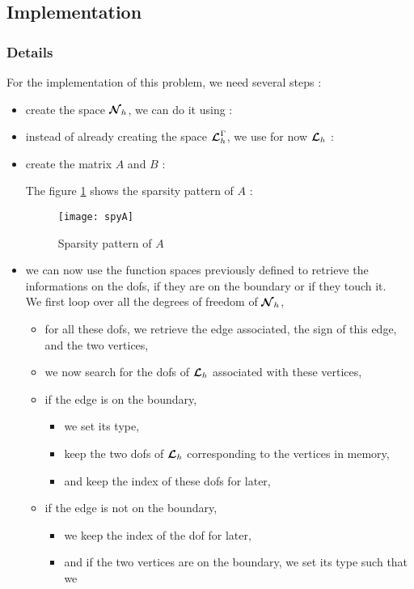 \subsection{Implementation}
\subsubsection{Details}

For the implementation of this problem, we need several steps :
\begin{itemize}
\item create the space ${\bm{\mathcal{N}}}_h$, we can do it using :

\item instead of already creating the space ${\bm{\mathcal{L}}}_h^\Gamma$, we use for now ${\bm{\mathcal{L}}}_h$ :

\item create the matrix $A$ and $B$ :

The figure \ref{spyA} shows the sparsity pattern of $A$ : 
\begin{figure}[H]
\centering
\texttt{[image: spyA]}
\caption{Sparsity pattern of $A$}
\label{spyA}
\end{figure}
\item we can now use the function spaces previously defined to retrieve the
  informations on the dofs, if they are on the boundary or if they touch it.\\
We first loop over all the degrees of freedom of ${\bm{\mathcal{N}}}_h$,
\begin{itemize}
\item for all these dofs, we retrieve the edge associated, the sign of this
  edge, and the two vertices,
\item we now search for the dofs of ${\bm{\mathcal{L}}}_h$ associated with these vertices,
\item if the edge is on the boundary,
\begin{itemize}
\item we set its type,
\item keep the two dofs of ${\bm{\mathcal{L}}}_h$ corresponding to the vertices in memory,
\item  and keep the index of these dofs for later,
\end{itemize}
\item if the edge is not on the boundary,
\begin{itemize}
\item we keep the index of the dof for later,
\item and if the two vertices are on the boundary, we set its type such that we

\end{itemize}
\end{itemize}
\end{itemize}
